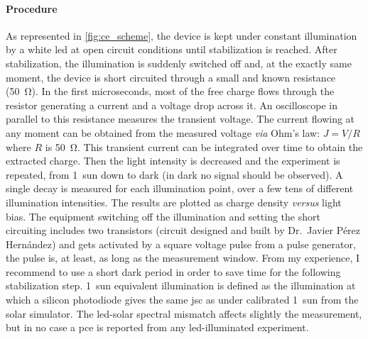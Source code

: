 	\paragraph{Procedure}
	As represented in \cref{fig:ce_scheme}, the device is kept under constant illumination by a white \gls{led} at open circuit conditions until stabilization is reached.
	After stabilization, the illumination is suddenly switched off and, at the exactly same moment, the device is short circuited through a small and known resistance (\SI{50}{\ohm}).
	In the first microseconds, most of the free charge flows through the resistor generating a current and a voltage drop across it.
	An oscilloscope in parallel to this resistance measures the transient voltage.
	The current flowing at any moment can be obtained from the measured voltage \textsl{via} Ohm's law: $J=V/R$ where $R$ is \SI{50}{\ohm}.
	This transient current can be integrated over time to obtain the extracted charge.
	Then the light intensity is decreased and the experiment is repeated, from 1~sun down to dark (in dark no signal should be observed).
	A single decay is measured for each illumination point, over a few tens of different illumination intensities.
	The results are plotted as charge density \textsl{versus} light bias.
	The equipment switching off the illumination and setting the short circuiting includes two transistors (circuit designed and built by Dr.\ Javier Pérez Hernández) and gets activated by a square voltage pulse from a pulse generator, the pulse is, at least, as long as the measurement window.
	From my experience, I recommend to use a short dark period in order to save time for the following stabilization step.
	1~sun equivalent illumination is defined as the illumination at which a silicon photodiode gives the same \gls{jsc} as under calibrated 1~sun from the solar simulator.
	The \gls{led}-solar spectral mismatch affects slightly the measurement, but in no case a \gls{pce} is reported from any \gls{led}-illuminated experiment.

